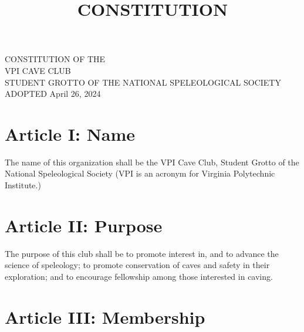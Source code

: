 \documentclass[
]{article}
\title{CONSTITUTION}
\author{}
\date{}
\begin{document}
\maketitle

{
\setcounter{tocdepth}{3}
\tableofcontents
}
\newpage{}

CONSTITUTION OF THE\\
VPI CAVE CLUB\\
STUDENT GROTTO OF THE NATIONAL SPELEOLOGICAL SOCIETY\\
ADOPTED April 26, 2024

\hypertarget{article-i-name}{%
\section{Article I: Name}\label{article-i-name}}

The name of this organization shall be the VPI Cave Club, Student Grotto
of the National Speleological Society (VPI is an acronym for Virginia
Polytechnic Institute.)

\hypertarget{article-ii-purpose}{%
\section{Article II: Purpose}\label{article-ii-purpose}}

The purpose of this club shall be to promote interest in, and to advance
the science of speleology; to promote conservation of caves and safety
in their exploration; and to encourage fellowship among those interested
in caving.

\hypertarget{article-iii-membership}{%
\section{Article III: Membership}\label{article-iii-membership}}
\end{document}
